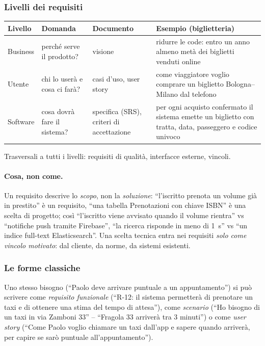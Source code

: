 \documentclass[a4paper,12pt]{article}
\begin{document}
\subsubsection{Livelli dei requisiti}
\begin{center}
\small
\begin{tabular}{|l|p{3.6cm}|p{3.4cm}|p{6cm}|}
\hline
\textbf{Livello} & \textbf{Domanda} & \textbf{Documento} & \textbf{Esempio (biglietteria)}\\
\hline
Business & perché serve il prodotto? & visione & ridurre le code: entro un anno almeno
metà dei biglietti venduti online\\
\hline
Utente & chi lo userà e cosa ci farà? & casi d'uso, user story & come viaggiatore voglio
comprare un biglietto Bologna--Milano dal telefono\\
\hline
Software & cosa dovrà fare il sistema? & specifica (SRS), criteri di accettazione & per ogni
acquisto confermato il sistema emette un biglietto con tratta, data, passeggero e codice
univoco\\
\hline
\end{tabular}
\end{center}
Trasversali a tutti i livelli: requisiti di qualità, interfacce esterne, vincoli.

\paragraph{Cosa, non come.} Un requisito descrive lo \emph{scopo}, non la \emph{soluzione}:
``l'iscritto prenota un volume già in prestito'' è un requisito, ``una tabella Prenotazioni
con chiave ISBN'' è una scelta di progetto; così ``l'iscritto viene avvisato quando il volume
rientra'' vs ``notifiche push tramite Firebase'', ``la ricerca risponde in meno di 1~s'' vs
``un indice full-text Elasticsearch''. Una scelta tecnica entra nei requisiti \emph{solo come
vincolo motivato}: dal cliente, da norme, da sistemi esistenti.

\subsubsection{Le forme classiche}
Uno stesso bisogno (``Paolo deve arrivare puntuale a un appuntamento'') si può scrivere come
\emph{requisito funzionale} (``R-12: il sistema permetterà di prenotare un taxi e di
ottenere una stima del tempo di attesa''), come \emph{scenario} (``Ho bisogno di un taxi in
via Zamboni 33'' -- ``Fragola 33 arriverà tra 3 minuti'') o come \emph{user story} (``Come
Paolo voglio chiamare un taxi dall'app e sapere quando arriverà, per capire se sarò puntuale
all'appuntamento'').
\end{document}
